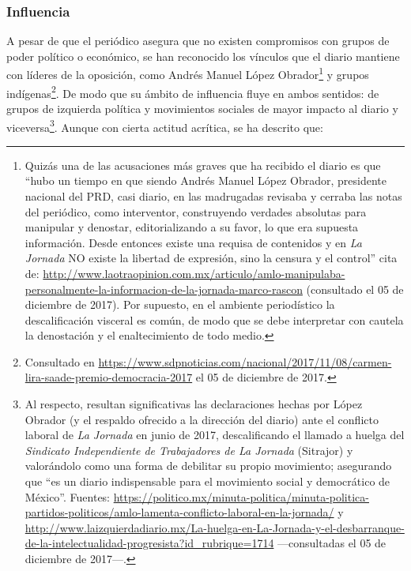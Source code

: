 \documentclass[letterpaper, 11pt]{book}
\theoremstyle{definition}
\theoremstyle{remark}
\begin{document}
\subsubsection{Influencia}
\label{sec:LaJornadaDiario_Influencia}

A pesar de que el periódico asegura que no existen compromisos con grupos de poder político o económico, se han reconocido los vínculos que el diario mantiene con líderes de la oposición, como Andrés Manuel López Obrador\footnote{
    Quizás una de las acusaciones más graves que ha recibido el diario es que ``hubo un tiempo en que siendo Andrés Manuel López Obrador, presidente nacional del PRD, casi diario, en las madrugadas revisaba y cerraba las notas del periódico, como interventor, construyendo verdades absolutas para manipular y denostar, editorializando a su favor, lo que era supuesta información. 
    Desde entonces existe una requisa de contenidos y en \emph{La Jornada} NO existe la libertad de expresión, sino la censura y el control'' cita de: \url{http://www.laotraopinion.com.mx/articulo/amlo-manipulaba-personalmente-la-informacion-de-la-jornada-marco-rascon} (consultado el 05 de diciembre de 2017). 
    Por supuesto, en el ambiente periodístico la descalificación visceral es común, de modo que se debe interpretar con cautela la denostación y el enaltecimiento de todo medio.
} y grupos indígenas\footnote{
    Consultado en \url{https://www.sdpnoticias.com/nacional/2017/11/08/carmen-lira-saade-premio-democracia-2017} el 05 de diciembre de 2017.
}. 
De modo que su ámbito de influencia fluye en ambos sentidos: de grupos de izquierda política y movimientos sociales de mayor impacto al diario y viceversa\footnote{
    Al respecto, resultan significativas las declaraciones hechas por López Obrador (y el respaldo ofrecido a la dirección del diario) ante el conflicto laboral de \emph{La Jornada} en junio de 2017, descalificando el llamado a huelga del \emph{Sindicato Independiente de Trabajadores de La Jornada} (Sitrajor) y valorándolo como una forma de debilitar su propio movimiento; asegurando que ``es un diario indispensable para el movimiento social y democrático de México''. 
    Fuentes:  \url{https://politico.mx/minuta-politica/minuta-politica-partidos-politicos/amlo-lamenta-conflicto-laboral-en-la-jornada/}  y \url{http://www.laizquierdadiario.mx/La-huelga-en-La-Jornada-y-el-desbarranque-de-la-intelectualidad-progresista?id_rubrique=1714} ---consultadas el 05 de diciembre de 2017---.
}. 
Aunque con cierta actitud acrítica, se ha descrito que:
\end{document}
